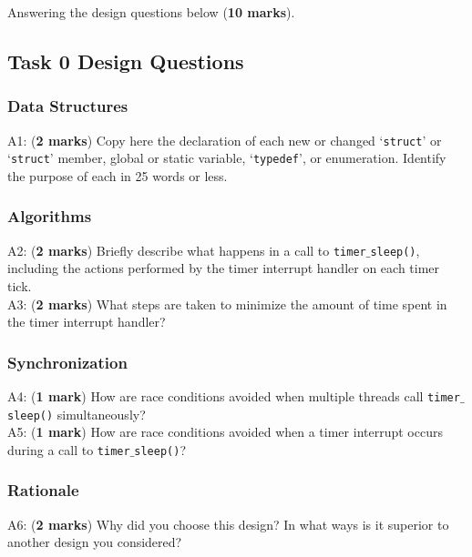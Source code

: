 \documentclass[a4paper,12pt]{article}
\begin{document}
Answering the design questions below ({\bf 10 marks}).

\subsection*{Task 0 Design Questions}

\subsubsection*{Data Structures}
A1: ({\bf 2 marks}) Copy here the declaration of each new or changed `\texttt{struct}' or `\texttt{struct}' member, global or static variable, `\texttt{typedef}', or enumeration. Identify the purpose of each in 25 words or less.

\subsubsection*{Algorithms}
A2: ({\bf 2 marks}) Briefly describe what happens in a call to \texttt{timer$\_$sleep()}, including the actions performed by the timer interrupt handler on each timer tick. \\

\noindent A3: ({\bf 2 marks}) What steps are taken to minimize the amount of time spent in the timer interrupt handler?

\subsubsection*{Synchronization}
A4: ({\bf 1 mark}) How are race conditions avoided when multiple threads call \texttt{timer$\_$sleep()} simultaneously? \\ 

\noindent A5: ({\bf 1 mark}) How are race conditions avoided when a timer interrupt occurs during a call to \texttt{timer$\_$sleep()}?

\subsubsection*{Rationale}
A6: ({\bf 2 marks}) Why did you choose this design?  
In what ways is it superior to another design you considered?
\end{document}
